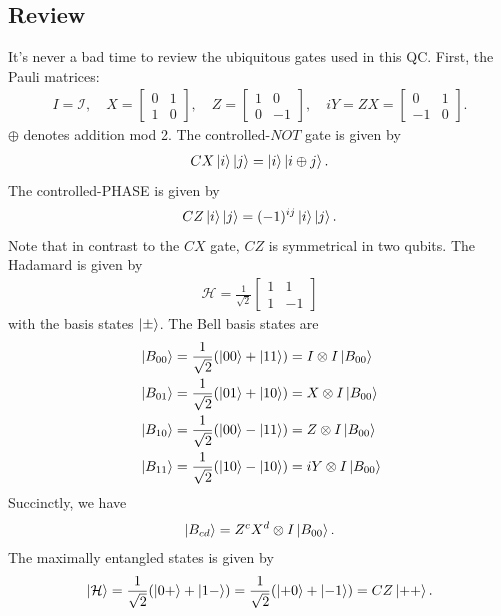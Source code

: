 \documentclass{book}
\theoremstyle{definition}
\newcommand{\nn}{\nonumber}
\newcommand{\had}{\mathcal{H}}
\newcommand{\f}[2]{\frac{#1}{#2}}
\newcommand{\Id}{\mathcal{I}}
\begin{document}
\subsection{Review}

It's never a bad time to review the ubiquitous gates used in this QC. First, the Pauli matrices:
\begin{align}
I = \Id, \quad X = \begin{bmatrix}
0 & 1 \\ 1 & 0
\end{bmatrix},\quad Z = \begin{bmatrix}
1 & 0 \\ 0 & -1
\end{bmatrix},\quad iY = ZX = \begin{bmatrix}
0 & 1 \\ -1 & 0
\end{bmatrix}.
\end{align}
$\oplus$ denotes addition mod 2. The controlled-$NOT$ gate is given by 
\begin{align}
CX\ket{i}\ket{j} = \ket{i}\ket{i\oplus j}.
\end{align}
The controlled-PHASE is given by
\begin{align}
CZ\ket{i}\ket{j} = (-1)^{ij}\ket{i}\ket{j}.
\end{align}
Note that in contrast to the $CX$ gate, $CZ$ is symmetrical in two qubits. The Hadamard is given by
\begin{align}
\had = \f{1}{\sqrt{2}}\begin{bmatrix}
1 & 1 \\ 1 & -1
\end{bmatrix}
\end{align}
with the basis states $\ket{\pm}$. The Bell basis states are
\begin{align}
&\ket{B_{00}} = \f{1}{\sqrt{2}}(\ket{00} + \ket{11}) = I\otimes I \ket{B_{00}}\nn\\
&\ket{B_{01}} = \f{1}{\sqrt{2}}(\ket{01} + \ket{10}) = X\otimes I \ket{B_{00}}\nn\\
&\ket{B_{10}} = \f{1}{\sqrt{2}}(\ket{00} - \ket{11}) = Z\otimes I \ket{B_{00}}\nn\\
&\ket{B_{11}} = \f{1}{\sqrt{2}}(\ket{10} - \ket{10}) = iY\otimes I \ket{B_{00}}\nn\\
\end{align}
Succinctly, we have
\begin{align}
\ket{B_{cd}} =Z^c X^d \otimes I \ket{B_{00}}.
\end{align}
The maximally entangled states is given by
\begin{align}
\ket{\had} = \f{1}{\sqrt{2}}(\ket{0+} + \ket{1-}) = \f{1}{\sqrt{2}}(\ket{+0} + \ket{-1}) = CZ\ket{++}.
\end{align}
\end{document}
